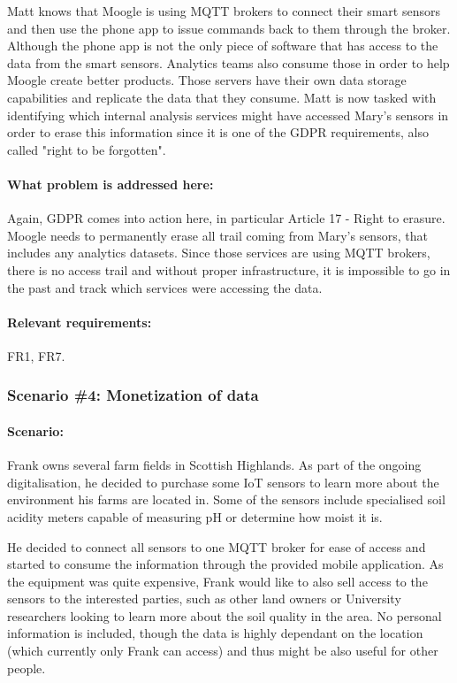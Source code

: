 Matt knows that Moogle is using MQTT brokers to connect their smart sensors and then use the phone app to issue commands back to them through the broker. Although the phone app is not the only piece of software that has access to the data from the smart sensors. Analytics teams also consume those in order to help Moogle create better products. Those servers have their own data storage capabilities and replicate the data that they consume. Matt is now tasked with identifying which internal analysis services might have accessed Mary's sensors in order to erase this information since it is one of the GDPR requirements, also called "right to be forgotten".
\paragraph{\textbf{What problem is addressed here:}}
Again, GDPR comes into action here, in particular Article 17 - Right to erasure. Moogle needs to permanently erase all trail coming from Mary's sensors, that includes any analytics datasets. Since those services are using MQTT brokers, there is no access trail and without proper infrastructure, it is impossible to go in the past and track which services were accessing the data.
\paragraph{\textbf{Relevant requirements:}} FR1, FR7.
\\
\subsubsection{Scenario \#4: Monetization of data}
\paragraph{\textbf{Scenario:}}
Frank owns several farm fields in Scottish Highlands. As part of the ongoing digitalisation, he decided to purchase some IoT sensors to learn more about the environment his farms are located in. Some of the sensors include specialised soil acidity meters capable of measuring pH or determine how moist it is.

He decided to connect all sensors to one MQTT broker for ease of access and started to consume the information through the provided mobile application. As the equipment was quite expensive, Frank would like to also sell access to the sensors to the interested parties, such as other land owners or University researchers looking to learn more about the soil quality in the area. No personal information is included, though the data is highly dependant on the location (which currently only Frank can access) and thus might be also useful for other people. 
